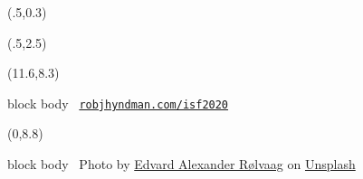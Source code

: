 
\usepackage{amsmath, bm, amssymb, amsthm, mathrsfs}
\usepackage[bb=boondox]{mathalfa}
\usepackage{url}
\usepackage{multirow, booktabs, float, textcmds, siunitx}
\usepackage{bm,booktabs,animate,ragged2e,multicol,microtype,hyperref}
\usepackage{tikz}

\graphicspath{{figs/}{tourism/}{energy/}}
\def\full#1{\vspace*{0.05cm}\centerline{\texttt{[image: \#1]}}}

\fontsize{13}{15}\sf
\usepackage[scale=0.85]{sourcecodepro}
\usepackage{fontawesome}

{
\begin{textblock}{10.5}(.5,0.3)
{\fontsize{26}{26}\sf\color[RGB]{204,89,0}\raggedright
\bfseries\inserttitle}
\end{textblock}
\begin{textblock}{7.5}(.5,2.5)
{\color[RGB]{130,92,68}\raggedright{\insertauthor}\quad\insertdate}
\end{textblock}
\begin{textblock}{4.2}(11.6,8.3)
\begin{beamercolorbox}[wd=4.3cm,ht=0.35cm,dp=0.2cm]{block body}
\fontsize{10}{10}\sf\color[RGB]{72,45,34}~\texttt{\href{https://robjhyndman.com/isf2020}{robjhyndman.com/isf2020}}
\end{beamercolorbox}
\end{textblock}
\begin{textblock}{6.2}(0,8.8)
\begin{beamercolorbox}[wd=4.2cm]{block body}
\fontsize{6}{6}\sf\color[RGB]{72,45,34}~Photo by \href{https://unsplash.com/@edvardr?utm_source=unsplash&amp;utm_medium=referral&amp;utm_content=creditCopyText}{Edvard Alexander Rølvaag} on \href{https://unsplash.com/s/photos/hierarchy?utm_source=unsplash&amp;utm_medium=referral&amp;utm_content=creditCopyText}{Unsplash}
\end{beamercolorbox}
\end{textblock}}

